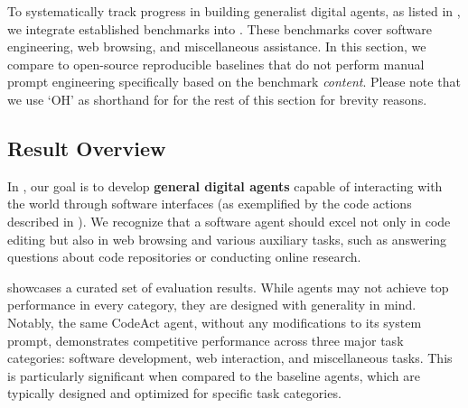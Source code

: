 To systematically track progress in building generalist digital agents, as listed in , we integrate \numbenchmarks established benchmarks into \projname. These benchmarks cover software engineering, web browsing, and miscellaneous assistance.
In this section, we compare \projname to open-source reproducible baselines that do not perform manual prompt engineering specifically based on the benchmark \textit{content}.
Please note that we use `OH' as shorthand for \projname for the rest of this section for brevity reasons.


\subsection{Result Overview} 
In \projname, our goal is to develop \textbf{general digital agents} capable of interacting with the world through software interfaces (as exemplified by the code actions described in ). We recognize that a software agent should excel not only in code editing but also in web browsing and various auxiliary tasks, such as answering questions about code repositories or conducting online research.

 showcases a curated set of evaluation results. While \projname agents may not achieve top performance in every category, they are designed with generality in mind. Notably, the same CodeAct agent, without any modifications to its system prompt, demonstrates competitive performance across three major task categories: software development, web interaction, and miscellaneous tasks. This is particularly significant when compared to the baseline agents, which are typically designed and optimized for specific task categories.


